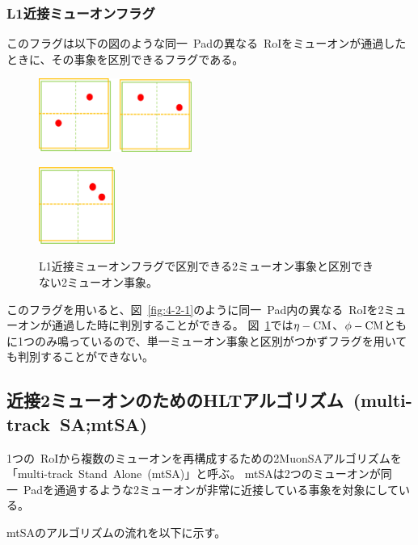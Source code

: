 \subsubsection{L1近接ミューオンフラグ}
このフラグは以下の図のような同一~Padの異なる~RoIをミューオンが通過したときに、その事象を区別できるフラグである。

\begin{figure}[H]
  \begin{minipage}[b]{0.5\linewidth}
      \centering
      \includegraphics[clip, width=5cm]{fig/4/isflaged.png}
      \label{fig:4-2-1}
  \end{minipage}
    \begin{minipage}[b]{0.45\linewidth}
      \centering
      \includegraphics[clip, width=2.5cm]{fig/4/isNotflaged.png}
      \label{fig:4-2-2}
  \end{minipage}
  \caption{L1近接ミューオンフラグで区別できる2ミューオン事象と区別できない2ミューオン事象。}
\end{figure}

このフラグを用いると、図~\ref{fig:4-2-1}のように同一~Pad内の異なる~RoIを2ミューオンが通過した時に判別することができる。
図~\ref{fig:4-2-2}では$\eta-\rm{CM}$、$\phi-\rm{CM}$ともに1つのみ鳴っているので、単一ミューオン事象と区別がつかずフラグを用いても判別することができない。

\subsection{近接2ミューオンのためのHLTアルゴリズム~(multi-track~SA;mtSA)}\label{chapter4-1-2}
1つの~RoIから複数のミューオンを再構成するための2MuonSAアルゴリズムを「multi-track~Stand~Alone~(mtSA)」と呼ぶ。
mtSAは2つのミューオンが同一~Padを通過するような2ミューオンが非常に近接している事象を対象にしている。

mtSAのアルゴリズムの流れを以下に示す。

